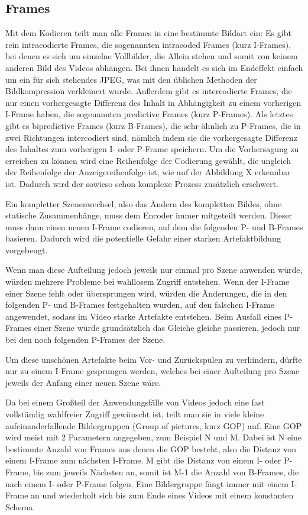 \subsection{Frames}
Mit dem Kodieren teilt man alle Frames in eine bestimmte Bildart ein:
Es gibt rein intracodierte Frames, die sogenannten intracoded Frames (kurz I-Frames), bei denen es sich um einzelne Vollbilder, die Allein stehen und somit von keinem anderen Bild des Videos abhängen. Bei ihnen handelt es sich im Endeffekt einfach um ein für sich stehendes JPEG, was mit den üblichen Methoden der Bildkompression verkleinert wurde.
Außerdem gibt es intercodierte Frames, die nur einen vorhergesagte Differenz des Inhalt in Abhängigkeit zu einem vorherigen I-Frame haben, die sogenannten predictive Frames (kurz P-Frames).
Als letztes gibt es bipredictive Frames (kurz B-Frames), die sehr ähnlich zu P-Frames, die in zwei Richtungen intercodiert sind, nämlich indem sie die vorhergesagte Differenz des Inhaltes zum vorherigen I- oder P-Frame speichern.
Um die Vorhersagung zu erreichen zu können wird eine Reihenfolge der Codierung gewählt, die ungleich der Reihenfolge der Anzeigereihenfolge ist, wie auf der Abbildung X erkennbar ist. Dadurch wird der sowieso schon komplexe Prozess zusätzlich erschwert.

Ein kompletter Szenenwechsel, also das Ändern des kompletten Bildes, ohne statische Zusammenhänge, muss dem Encoder immer mitgeteilt werden. Dieser muss dann einen neuen I-Frame codieren, auf dem die folgenden P- und B-Frames basieren. Dadurch wird die potentielle Gefahr einer starken Artefaktbildung vorgebeugt.

Wenn man diese Aufteilung jedoch jeweils nur einmal pro Szene anwenden würde, würden mehrere Probleme bei wahllosem Zugriff entstehen. Wenn der I-Frame einer Szene fehlt oder übersprungen wird, würden die Änderungen, die in den folgenden P- und B-Frames festgehalten wurden, auf den falschen I-Frame angewendet, sodass im Video starke Artefakte entstehen. Beim Ausfall eines P-Frames einer Szene würde grundsätzlich das Gleiche gleiche passieren, jedoch nur bei den noch folgenden P-Frames der Szene.

Um diese unschönen Artefakte beim Vor- und Zurückspulen zu verhindern, dürfte nur zu einem I-Frame gesprungen werden, welches bei einer Aufteilung pro Szene jeweils der Anfang einer neuen Szene wäre.

Da bei einem Großteil der Anwendungsfälle von Videos jedoch eine fast vollständig wahlfreier Zugriff gewünscht ist, teilt man sie in viele kleine aufeinanderfallende Bildergruppen (Group of pictures, kurz GOP) auf. Eine GOP wird meist mit 2 Parametern angegeben, zum Beispiel N und M.
Dabei ist N eine bestimmte Anzahl von Frames aus denen die GOP besteht, also die Distanz von einem I-Frame zum nächsten I-Frame.
M gibt die Distanz von einem I- oder P-Frame, bis zum jeweils Nächsten an, somit ist M-1 die Anzahl von B-Frames, die nach einem I- oder P-Frame folgen. Eine Bildergruppe fängt immer mit einem I-Frame an und wiederholt sich bis zum Ende eines Videos mit einem konstanten Schema.

